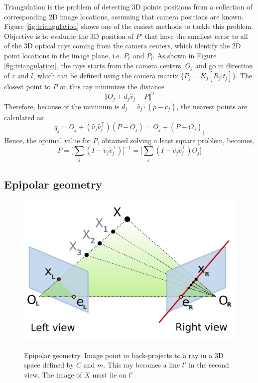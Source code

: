 Triangulation is the problem of detecting 3D points positions from a collection of corresponding 2D image locations, assuming that camera positions are known.
Figure \ref{fig:triangulation} shows one of the easiest methods to tackle this problem. 
Objective is to evaluate the 3D position of $P'$ that have the smallest error to all of the 3D optical rays coming from the camera centers, which identify the 2D point locations in the image plane, i.e. $P_r$ and $P_l$.
As shown in Figure \ref{fig:triangulation}, the rays starts from the camera centers, $O_j$ and go in direction of $r$ and $l$, which can be defined using the camera matrix $ \{ P_j = K_j [ R_j | t_j ] \} $.
The closest point to $P$ on this ray minimizes the distance
\begin{equation}\label{eqn:mindist}
	\Vert O_j + d_j \hat{v}_j - P \Vert^2
\end{equation}
Therefore, because of the minimum is $d_j = \hat{v}_j \cdot (p - c_j)$, the nearest points are calculated as:
\begin{equation}\label{eqn:closestpoint}
	q_j = O_j + (\hat{v}_j \hat{v}_j^\top)(P - O_j) = O_j + (P - O_j)_{\Vert}
\end{equation}
Hence, the optimal value for $P$, obtained solving a least square problem, becomes,
\begin{equation}\label{eqn:solP}
	P = \Big[ \sum_j (I - \hat{v}_j \hat{v}_j^\top ) \Big]^{-1} = \Big[ \sum_j (I - \hat{v}_j \hat{v}_j^\top )O_j \Big]
\end{equation}

\subsection{Epipolar geometry}
\label{subsec:epipolargeom}

\begin{figure}[t]
	\begin{center}
		{\includegraphics[width=.8\textwidth]{images/epipolar-geometry-2}}
\caption{Epipolar geometry. Image point $m$ back-projects to a ray in a 3D space defined by $C$ and $m$. This ray becomes a line $l'$ in the second view. The image of $X$ must lie on $l'$}
\label{fig:epipolargeom-2}
	\end{center}
\end{figure}

